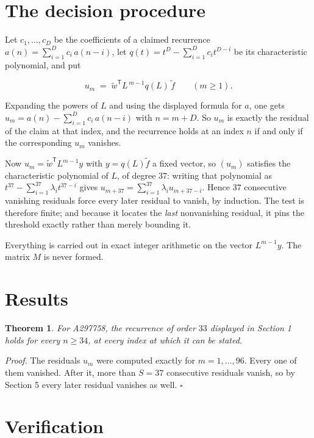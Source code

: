 \documentclass[11pt]{article}
\newtheorem{theorem}{Theorem}
\theoremstyle{definition}
\begin{document}
\section{The decision procedure}

Let $c_1,\dots,c_D$ be the coefficients of a claimed recurrence $a(n) = \sum_{i=1}^{D} c_i\,a(n-i)$, let $q(t) = t^{D} - \sum_{i=1}^{D} c_i t^{D-i}$ be its characteristic polynomial, and put

\[u_m \;=\; \tilde w^{\mathsf T} L^{\,m-1} q(L)\,\tilde f \qquad (m \ge 1).\]

Expanding the powers of $L$ and using the displayed formula for $a$, one gets $u_m = a(n) - \sum_{i=1}^{D} c_i\,a(n-i)$ with $n = m + D$. So $u_m$ is exactly the residual of the claim at that index, and the recurrence holds at an index $n$ if and only if the corresponding $u_m$ vanishes.

Now $u_m = \tilde w^{\mathsf T} L^{m-1} y$ with $y = q(L)\tilde f$ a fixed vector, so $(u_m)$ satisfies the characteristic polynomial of $L$, of degree $37$: writing that polynomial as $t^{37} - \sum_{i=1}^{37} \lambda_i t^{37-i}$ gives $u_{m+37} = \sum_{i=1}^{37} \lambda_i u_{m+37-i}$. Hence $37$ consecutive vanishing residuals force every later residual to vanish, by induction. The test is therefore finite; and because it locates the {\itshape last} nonvanishing residual, it pins the threshold exactly rather than merely bounding it.

Everything is carried out in exact integer arithmetic on the vector $L^{m-1}y$. The matrix $M$ is never formed.

\section{Results}

\begin{theorem} For A297758, the recurrence of order $33$ displayed in Section 1 holds for every $n \ge 34$, at every index at which it can be stated.\end{theorem}

{\itshape Proof.} The residuals $u_m$ were computed exactly for $m = 1,\dots,96$. Every one of them vanished. After it, more than $S = 37$ consecutive residuals vanish, so by Section 5 every later residual vanishes as well. $\square$

\section{Verification}
\end{document}
